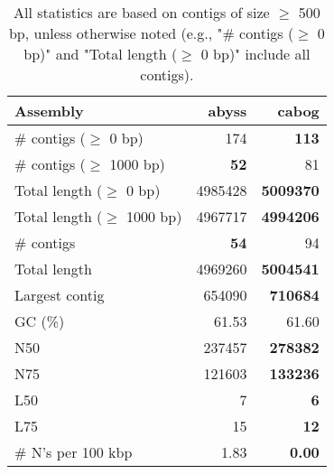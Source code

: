 \documentclass[12pt,a4paper]{article}
\begin{document}
\begin{table}[ht]
\begin{center}
\caption{All statistics are based on contigs of size $\geq$ 500 bp, unless otherwise noted (e.g., "\# contigs ($\geq$ 0 bp)" and "Total length ($\geq$ 0 bp)" include all contigs).}
\begin{tabular}{|l*{2}{|r}|}
\hline
Assembly & abyss & cabog \\ \hline
\# contigs ($\geq$ 0 bp) & 174 & {\bf 113} \\ \hline
\# contigs ($\geq$ 1000 bp) & {\bf 52} & 81 \\ \hline
Total length ($\geq$ 0 bp) & 4985428 & {\bf 5009370} \\ \hline
Total length ($\geq$ 1000 bp) & 4967717 & {\bf 4994206} \\ \hline
\# contigs & {\bf 54} & 94 \\ \hline
Total length & 4969260 & {\bf 5004541} \\ \hline
Largest contig & 654090 & {\bf 710684} \\ \hline
GC (\%) & 61.53 & 61.60 \\ \hline
N50 & 237457 & {\bf 278382} \\ \hline
N75 & 121603 & {\bf 133236} \\ \hline
L50 & 7 & {\bf 6} \\ \hline
L75 & 15 & {\bf 12} \\ \hline
\# N's per 100 kbp & 1.83 & {\bf 0.00} \\ \hline
\end{tabular}
\end{center}
\end{table}
\end{document}
